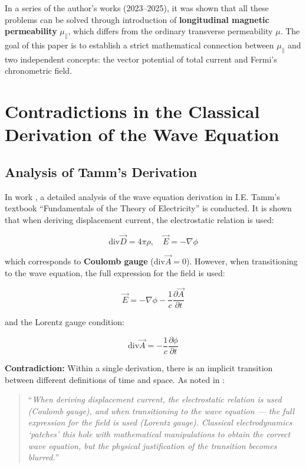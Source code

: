 \documentclass[12pt, a4paper]{article}
\begin{document}
In a series of the author's works (2023--2025), it was shown that all these problems can be solved through introduction of \textbf{longitudinal magnetic permeability} $\mu_{\parallel}$, which differs from the ordinary transverse permeability $\mu$. The goal of this paper is to establish a strict mathematical connection between $\mu_{\parallel}$ and two independent concepts: the vector potential of total current and Fermi's chronometric field.

\section{Contradictions in the Classical Derivation of the Wave Equation}

\subsection{Analysis of Tamm's Derivation}

In work \cite{JugglingCalibrations}, a detailed analysis of the wave equation derivation in I.E. Tamm's textbook ``Fundamentals of the Theory of Electricity'' is conducted. It is shown that when deriving displacement current, the electrostatic relation is used:

\begin{equation}
\text{div} \vec{D} = 4\pi\rho, \quad \vec{E} = -\nabla \phi
\label{eq:coulomb_gauge}
\end{equation}

which corresponds to \textbf{Coulomb gauge} ($\text{div} \vec{A} = 0$). However, when transitioning to the wave equation, the full expression for the field is used:

\begin{equation}
\vec{E} = -\nabla \phi - \frac{1}{c}\frac{\partial \vec{A}}{\partial t}
\label{eq:full_field}
\end{equation}

and the Lorentz gauge condition:

\begin{equation}
\text{div} \vec{A} = -\frac{1}{c}\frac{\partial \phi}{\partial t}
\label{eq:lorentz_gauge}
\end{equation}

\textbf{Contradiction:} Within a single derivation, there is an implicit transition between different definitions of time and space. As noted in \cite{JugglingCalibrations}:

\begin{quote}
``\textit{When deriving displacement current, the electrostatic relation is used (Coulomb gauge), and when transitioning to the wave equation --- the full expression for the field is used (Lorentz gauge). Classical electrodynamics `patches' this hole with mathematical manipulations to obtain the correct wave equation, but the physical justification of the transition becomes blurred.}''
\end{quote}
\end{document}
